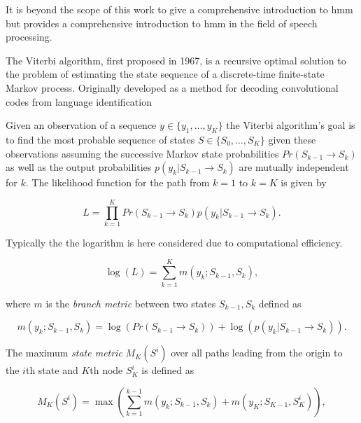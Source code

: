 It is beyond the scope of this work to give a comprehensive introduction to \gls{hmm} but \cite{Rabiner1989} provides a comprehensive introduction to \gls{hmm} in the field of speech processing.

The Viterbi algorithm, first proposed in 1967\cite{Viterbi1967}, is a recursive optimal solution to the problem of estimating the state sequence of a discrete-time finite-state Markov process\cite{Forney1973}. Originally developed as a method for decoding convolutional codes
from language identification \cite{Nagarajan2004}

Given an observation of a sequence $y \in \{y_1,\ldots,y_K\}$ the Viterbi algorithm's goal is to find the most probable sequence of states $S \in \{S_0,\ldots,S_K \}$ given these observations assuming the successive Markov state probabilities $Pr(S_{k-1} \rightarrow S_{k})$ as well as the output probabilities $p(y_k | S_{k-1} \rightarrow S_{k})$ are mutually independent for $k$. The likelihood function for the path from $k=1$ to $k=K$ is given by

\begin{equation}\label{eq:viterbiLitRev}
L = \prod_{k=1}^K Pr(S_{k-1} \rightarrow S_{k}) p(y_k | S_{k-1} \rightarrow S_{k}).
\end{equation}

Typically the the logarithm is here considered due to computational efficiency.

\begin{equation}\label{eq:viterbiLitRev2}
\log{\left(L\right)} = \sum_{k=1}^K m(y_k ; S_{k-1}, S_{k}),
\end{equation}

where $m$ is the \emph{branch metric} between two states $S_{k-1}, S_{k}$ defined as

\begin{equation}\label{eq:viterbiLitRev3}
m(y_k ; S_{k-1}, S_{k}) = \log{\left( Pr(S_{k-1} \rightarrow S_{k}) \right)} + \log{\left( p(y_k | S_{k-1} \rightarrow S_{k}) \right)}.
\end{equation}

The maximum \emph{state metric} $M_K(S^i)$ over all paths leading from the origin to the $i$th state and $K$th node $S_K^i$ is defined as

\begin{equation}\label{eq:viterbiLitRev4}
M_K(S^i) = \max \left( \sum_{k=1}^{k-1} m(y_k ; S_{k-1}, S_{k}) + m(y_K ; S_{K-1}, S_{K}^i)\right),
\end{equation}

